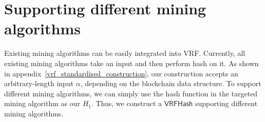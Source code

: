 \section{Supporting different mining algorithms}


Existing mining algorithms can be easily integrated into VRF.
Currently, all existing mining algorithms take an input and then perform hash on it. 
As shown in appendix~\ref{vrf_standardised_construction}, our construction accepts an arbitrary-length input $\alpha$, depending on the blockchain data structure.
To support different mining algorithms, we can simply use the hash function in the targeted mining algorithm as our $H_{1}$.
Thus, we construct a $\mathsf{VRFHash}$ supporting different mining algorithms.